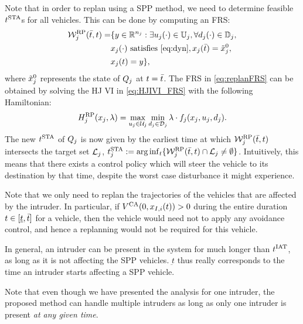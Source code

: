 Note that in order to replan using a SPP method, we need to determine feasible $t^\text{STA}$s for all vehicles. This can be done by computing an FRS:
\begin{equation} \label{eq:replanFRS}
\begin{aligned} 
\frs_j^{\text{RP}}(\tea, t) = & \{y \in \R^{n_j}: \exists \ctrl_j(\cdot) \in \cfset_j, \forall \dstb_j(\cdot) \in \dfset_j, \\
& \state_j(\cdot) \text{ satisfies \eqref{eq:dyn}}, \state_j(\tea) = \tilde{\state}_j^0, \\
& \state_j(t) = y\},
\end{aligned}
\end{equation}
where $\tilde{x}_j^0$ represents the state of $Q_j$ at $t = \bar{t}$. The FRS in \eqref{eq:replanFRS} can be obtained by solving the HJ VI in \eqref{eq:HJIVI_FRS} with the following Hamiltonian:
\begin{equation}
H_j^{\text{RP}}(x_j, \lambda) = \max_{u_j \in \mathcal{U}_j} \min_{d_j \in \mathcal{D}_j} \lambda \cdot f_j (x_j, u_j, d_j). 
\end{equation} 
The new $t^\text{STA}$ of $Q_j$ is now given by the earliest time at which $\mathcal{W}_j^{\text{RP}}(\bar{t}, t)$ intersects the target set $\mathcal{L}_j$, $t^\text{STA}_j := \arg \inf_t \{ \mathcal{W}_j^{\text{RP}}(\bar{t}, t) \cap \mathcal{L}_j \neq \emptyset \}$. Intuitively, this means that there exists a control policy which will steer the vehicle to its destination by that time, despite the worst case disturbance it might experience.

\begin{remark}
Note that we only need to replan the trajectories of the vehicles that are affected by the intruder. In particular, if $V^{\text{CA}}(0, x_{I, i}(t)) > 0$ during the entire duration $t \in [\underline{t}, \bar{t}]$ for a vehicle, then the vehicle would need not to apply any avoidance control, and hence a replanning would not be required for this vehicle. 
\end{remark}

\begin{remark}
In general, an intruder can be present in the system for much longer than $t^\text{IAT}$, as long as it is not affecting the SPP vehicles. $\underbar{t}$ thus really corresponds to the time an intruder starts affecting a SPP vehicle.
\end{remark}

\begin{remark}
Note that even though we have presented the analysis for one intruder, the proposed method can handle multiple intruders as long as only one intruder is present \textit{at any given time}. 
\end{remark}

